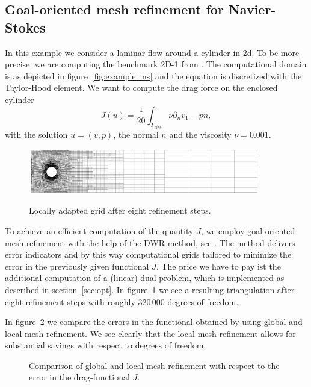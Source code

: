 \documentclass[smallextended]{svjour3}       %
\numberwithin{equation}{section}
\begin{document}
\subsection{Goal-oriented mesh refinement for Navier-Stokes}
In this example we consider a laminar flow around a cylinder in 2d. To be more precise, we are computing the benchmark 2D-1 from \cite{TuSchae96}. The computational domain is as depicted in figure~\ref{fig:example_ns} and the equation is discretized with the Taylor-Hood  element. We want to compute the drag force on the enclosed cylinder
\begin{equation}
J(u) = \frac 1 {20} \int_{\Gamma_{circ}} \nu\partial_nv _1 - pn,
\end{equation}
with the solution $u = (v,p)$, the normal $n$ and the viscosity $\nu = 0.001$.
\begin{figure}[hbt]
\centering
{\includegraphics[width=0.9\textwidth]{Pictures/local_grid_NS.png}}
\caption{Locally adapted grid after eight refinement steps.}
\label{fig:NS_local_grid}
\end{figure}
To achieve an efficient computation of the quantity $J$, we employ goal-oriented mesh refinement with the help of the DWR-method, see \cite{BeRa96}. The method delivers error indicators and by this way computational grids tailored to minimize the error in the previously given functional $J$. The price we have to pay ist the additional computation of a (linear) dual problem, which is implemented as described in section~\ref{sec:opt}. In figure~\ref{fig:NS_local_grid} we see a resulting triangulation after eight refinement steps with roughly $320\,000$ degrees of freedom.

In figure~\ref{fig:NS_comparison} we compare the errors in the functional obtained by using global and local mesh refinement. We see clearly that the local mesh refinement allows for substantial savings with respect to degrees of freedom.

\begin{figure}[hbt]
\centering
\resizebox{0.5\textwidth}{!}{}
\caption{Comparison of global and local mesh refinement with respect to the error in the drag-functional $J$.}
\label{fig:NS_comparison}
\end{figure}
\end{document}
